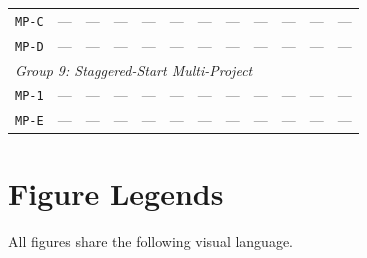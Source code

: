 \documentclass[12pt, a4paper]{article}
\begin{document}
\begin{longtable}{lccccccccccc}
\texttt{MP-C} & {\color{gray}---} & {\color{gray}---} & {\color{gray}---} & {\color{gray}---} & {\color{gray}---} & {\color{gray}---} & {\color{gray}---} & {\color{gray}---} & {\color{gray}---} & {\color{gray}---} & {\color{gray}---} \\
\texttt{MP-D} & {\color{gray}---} & {\color{gray}---} & {\color{gray}---} & {\color{gray}---} & {\color{gray}---} & {\color{gray}---} & {\color{gray}---} & {\color{gray}---} & {\color{gray}---} & {\color{gray}---} & {\color{gray}---} \\
\multicolumn{12}{l}{\small\textit{Group 9: Staggered-Start Multi-Project}} \\
\texttt{MP-1} & {\color{gray}---} & {\color{gray}---} & {\color{gray}---} & {\color{gray}---} & {\color{gray}---} & {\color{gray}---} & {\color{gray}---} & {\color{gray}---} & {\color{gray}---} & {\color{gray}---} & {\color{gray}---} \\
\texttt{MP-E} & {\color{gray}---} & {\color{gray}---} & {\color{gray}---} & {\color{gray}---} & {\color{gray}---} & {\color{gray}---} & {\color{gray}---} & {\color{gray}---} & {\color{gray}---} & {\color{gray}---} & {\color{gray}---} \\
\end{longtable}

\newpage

\section*{Figure Legends}
All figures share the following visual language.
\medskip
\end{document}

